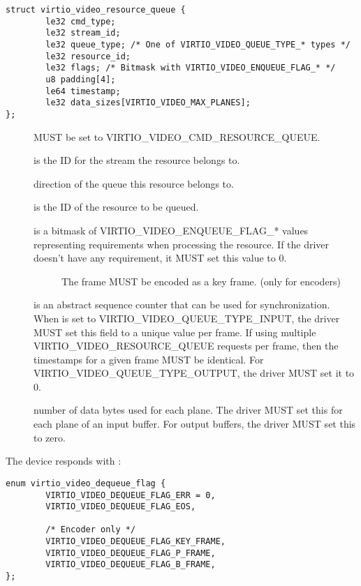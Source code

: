 \begin{description}
\begin{lstlisting}
struct virtio_video_resource_queue {
        le32 cmd_type;
        le32 stream_id;
        le32 queue_type; /* One of VIRTIO_VIDEO_QUEUE_TYPE_* types */
        le32 resource_id;
        le32 flags; /* Bitmask with VIRTIO_VIDEO_ENQUEUE_FLAG_* */
        u8 padding[4];
        le64 timestamp;
        le32 data_sizes[VIRTIO_VIDEO_MAX_PLANES];
};
\end{lstlisting}
\begin{description}
\item[] MUST be set to VIRTIO_VIDEO_CMD_RESOURCE_QUEUE.
\item[] is the ID for the stream the resource belongs to.
\item[] direction of the queue this resource belongs to.
\item[] is the ID of the resource to be queued.
\item[] is a bitmask of VIRTIO_VIDEO_ENQUEUE_FLAG_* values
  representing requirements when processing the resource. If the driver doesn't
  have any requirement, it MUST set this value to 0.
  \begin{description}
    \item[] The frame MUST be
      encoded as a key frame. (only for encoders)
  \end{description}
\item[] is an abstract sequence counter that can be
  used for synchronization. When  is set to
  VIRTIO_VIDEO_QUEUE_TYPE_INPUT, the driver MUST set this field to a unique
  value per frame. If using multiple VIRTIO_VIDEO_RESOURCE_QUEUE requests per
  frame, then the timestamps for a given frame MUST be identical.
  For VIRTIO_VIDEO_QUEUE_TYPE_OUTPUT, the driver MUST set it to 0.
\item[] number of data bytes used for each plane. The driver
  MUST set this for each plane of an input buffer. For output buffers, the
  driver MUST set this to zero.
\end{description}

The device responds with :
\begin{lstlisting}
enum virtio_video_dequeue_flag {
        VIRTIO_VIDEO_DEQUEUE_FLAG_ERR = 0,
        VIRTIO_VIDEO_DEQUEUE_FLAG_EOS,

        /* Encoder only */
        VIRTIO_VIDEO_DEQUEUE_FLAG_KEY_FRAME,
        VIRTIO_VIDEO_DEQUEUE_FLAG_P_FRAME,
        VIRTIO_VIDEO_DEQUEUE_FLAG_B_FRAME,
};


\end{lstlisting}
\end{description}

